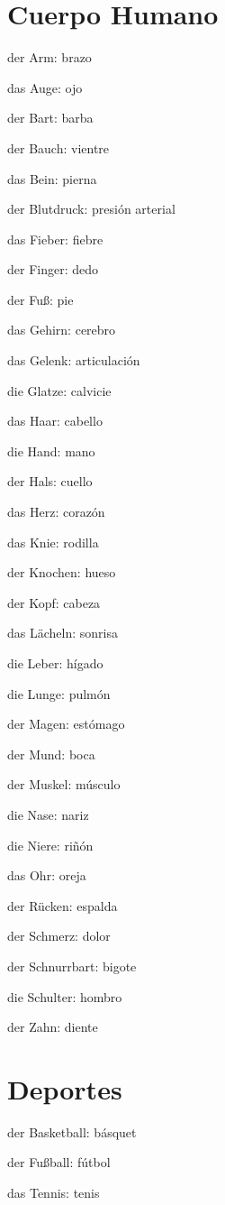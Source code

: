 \section{Cuerpo Humano}
\begin{multicols}{3}
\begin{myitemize}
\item der Arm: brazo
\item das Auge: ojo
\item der Bart: barba
\item der Bauch: vientre
\item das Bein: pierna
\item der Blutdruck: presión arterial
\item das Fieber: fiebre
\item der Finger: dedo
\item der Fuß: pie
\item das Gehirn: cerebro
\item das Gelenk: articulación
\item die Glatze: calvicie
\item das Haar: cabello
\item die Hand: mano
\item der Hals: cuello
\item das Herz: corazón
\item das Knie: rodilla
\item der Knochen: hueso
\item der Kopf: cabeza
\item das Lächeln: sonrisa
\item die Leber: hígado
\item die Lunge: pulmón
\item der Magen: estómago
\item der Mund: boca
\item der Muskel: músculo
\item die Nase: nariz
\item die Niere: riñón
\item das Ohr: oreja
\item der Rücken: espalda
\item der Schmerz: dolor
\item der Schnurrbart: bigote
\item die Schulter: hombro
\item der Zahn: diente
\end{myitemize}
\end{multicols}


\section{Deportes}
\begin{multicols}{3}
\begin{myitemize}
\item der Basketball: básquet
\item der Fußball: fútbol
\item das Tennis: tenis
\end{myitemize}
\end{multicols}

